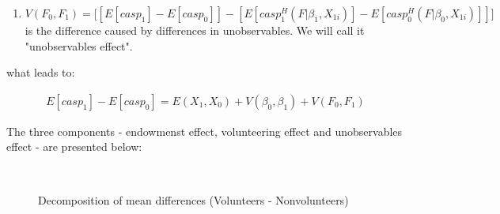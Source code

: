 \documentclass[10pt, letterpaper]{article}
\begin{document}
\begin{spacing}{1.4}
\begin{enumerate}
\item $ V(F_{0},F_{1}) =\bigg[ [E[casp_{1}]-E[casp_{0}]] - [E[casp^{H}_{1}(F|\beta_{1},X_{1i})]- E[casp^{H}_{0}(F|\beta_{0},X_{1i})]] \bigg] $ is the difference caused by differences in unobservables. We will call it "unobservables effect".

\end{enumerate}

what leads to:

  \begin{eqnarray} 
	E[casp_{1}]-E[casp_{0}]= E(X_{1},X_{0}) +  V(\beta_{0},\beta_{1}) +  V(F_{0},F_{1})
 \end{eqnarray}


The three components - endowmenst effect, volunteering effect and unobservables effect - are presented below:


\begin{figure}[H]
\centering
\caption{Decomposition of mean differences (Volunteers - Nonvolunteers)} 
\label{fig:pooling1}
\begin{minipage}{1\linewidth}
\quad
{}~\\

\end{minipage}
\end{figure}
 

\end{spacing}
\end{document}

